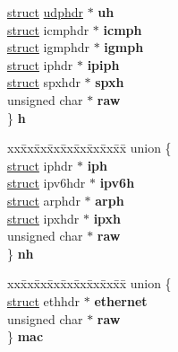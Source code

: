\begin{DoxyCompactItemize}
\begin{tabbing}
\>\hyperlink{interfacestruct}{struct} \hyperlink{structudphdr}{udphdr} $\ast$ {\bfseries uh}\\
\>\hyperlink{interfacestruct}{struct} icmphdr $\ast$ {\bfseries icmph}\\
\>\hyperlink{interfacestruct}{struct} igmphdr $\ast$ {\bfseries igmph}\\
\>\hyperlink{interfacestruct}{struct} iphdr $\ast$ {\bfseries ipiph}\\
\>\hyperlink{interfacestruct}{struct} spxhdr $\ast$ {\bfseries spxh}\\
\>unsigned char $\ast$ {\bfseries raw}\\
\} {\bfseries h}\\

\end{tabbing}\item 
\mbox{\label{structsk__buff_a7ec0491a900192b07a414ffc7590a043}} 
\begin{tabbing}
xx\=xx\=xx\=xx\=xx\=xx\=xx\=xx\=xx\=\kill
union \{\\
\>\hyperlink{interfacestruct}{struct} iphdr $\ast$ {\bfseries iph}\\
\>\hyperlink{interfacestruct}{struct} ipv6hdr $\ast$ {\bfseries ipv6h}\\
\>\hyperlink{interfacestruct}{struct} arphdr $\ast$ {\bfseries arph}\\
\>\hyperlink{interfacestruct}{struct} ipxhdr $\ast$ {\bfseries ipxh}\\
\>unsigned char $\ast$ {\bfseries raw}\\
\} {\bfseries nh}\\

\end{tabbing}\item 
\mbox{\label{structsk__buff_a5899799cd924362760158f506c821031}} 
\begin{tabbing}
xx\=xx\=xx\=xx\=xx\=xx\=xx\=xx\=xx\=\kill
union \{\\
\>\hyperlink{interfacestruct}{struct} ethhdr $\ast$ {\bfseries ethernet}\\
\>unsigned char $\ast$ {\bfseries raw}\\
\} {\bfseries mac}\\


\end{tabbing}
\end{DoxyCompactItemize}
